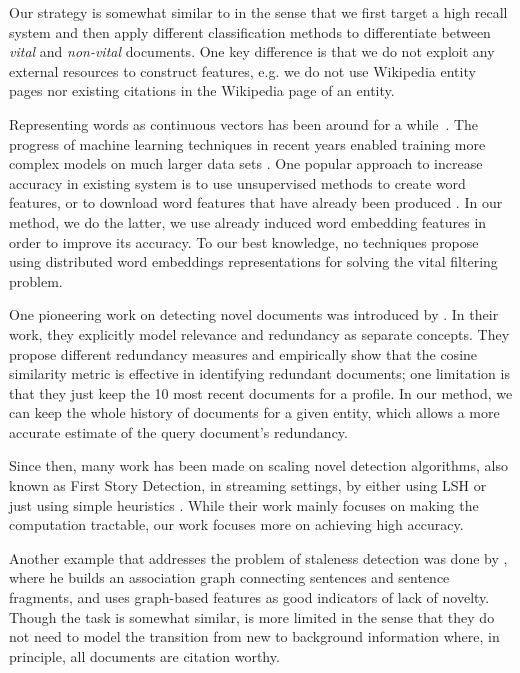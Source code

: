\documentclass{article}
\begin{document}
Our strategy is somewhat similar to \citet{jingang13} in the sense that we first target a high recall system and then apply different classification methods to differentiate between \emph{vital} and \emph{non-vital} documents. 
One key difference is that we do not exploit any external resources to construct features, e.g. we do not use Wikipedia entity pages nor existing citations in the Wikipedia page of an entity. 

Representing words as continuous vectors has been around for a while~\cite{Hinton87, Elman90findingstructure}. 
The progress of machine learning techniques in recent years enabled training more complex models on much larger data sets \cite{mikolovChen}. 
One popular approach to increase accuracy in existing system is to use unsupervised methods to create word features, or to download word features that have already been produced \cite{Turian10wordrepresentations}. In our method, we do the latter, we use already induced word embedding features in order to improve its accuracy. To our best knowledge, no techniques propose using distributed word embeddings representations for solving the vital filtering problem.

One pioneering work on detecting novel documents was introduced by \citet{Zhang2002}. In their work, they explicitly model relevance and redundancy as separate concepts. They propose different redundancy measures and empirically show that the cosine similarity metric is effective in identifying redundant documents; one limitation is that they just keep the 10 most recent documents for a profile. In our method, we can keep the whole history of documents for a given entity, which allows a more accurate estimate of the query document's redundancy.

Since then, many work has been made on scaling novel detection algorithms, also known as First Story Detection, in streaming settings, by either using LSH \cite{Petrovic2010} or just using simple heuristics \cite{Luo2007}. While their work mainly focuses on making the computation tractable, our work focuses more on achieving high accuracy. 

Another example that addresses the problem of staleness detection was done by \citet{gamon}, where he builds an association graph connecting sentences and sentence fragments, and uses graph-based features as good indicators of lack of novelty. Though the task is somewhat similar, is more limited in the sense that they do not need to model the transition from new to background information where, in principle, all documents are citation worthy.
\end{document}
